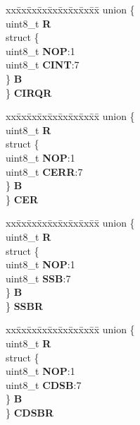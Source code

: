 \begin{DoxyCompactItemize}
\begin{tabbing}
\end{tabbing}\item 
\mbox{\label{structEDMA__tag_a6c3e6398c0bf0d30a1574350d98ff8d3}} 
\begin{tabbing}
xx\=xx\=xx\=xx\=xx\=xx\=xx\=xx\=xx\=\kill
union \{\\
\>uint8\_t {\bfseries R}\\
\>struct \{\\
\>\>uint8\_t {\bfseries NOP}:1\\
\>\>uint8\_t {\bfseries CINT}:7\\
\>\} {\bfseries B}\\
\} {\bfseries CIRQR}\\

\end{tabbing}\item 
\mbox{\label{structEDMA__tag_a379380a72c7c8b8d1023184d2ffd7bf5}} 
\begin{tabbing}
xx\=xx\=xx\=xx\=xx\=xx\=xx\=xx\=xx\=\kill
union \{\\
\>uint8\_t {\bfseries R}\\
\>struct \{\\
\>\>uint8\_t {\bfseries NOP}:1\\
\>\>uint8\_t {\bfseries CERR}:7\\
\>\} {\bfseries B}\\
\} {\bfseries CER}\\

\end{tabbing}\item 
\mbox{\label{structEDMA__tag_a719c6b82fbdb2408d910c4047cdf7a79}} 
\begin{tabbing}
xx\=xx\=xx\=xx\=xx\=xx\=xx\=xx\=xx\=\kill
union \{\\
\>uint8\_t {\bfseries R}\\
\>struct \{\\
\>\>uint8\_t {\bfseries NOP}:1\\
\>\>uint8\_t {\bfseries SSB}:7\\
\>\} {\bfseries B}\\
\} {\bfseries SSBR}\\

\end{tabbing}\item 
\mbox{\label{structEDMA__tag_a3c0cb0ccced69d7b1df95bd152c768be}} 
\begin{tabbing}
xx\=xx\=xx\=xx\=xx\=xx\=xx\=xx\=xx\=\kill
union \{\\
\>uint8\_t {\bfseries R}\\
\>struct \{\\
\>\>uint8\_t {\bfseries NOP}:1\\
\>\>uint8\_t {\bfseries CDSB}:7\\
\>\} {\bfseries B}\\
\} {\bfseries CDSBR}\\


\end{tabbing}
\end{DoxyCompactItemize}
